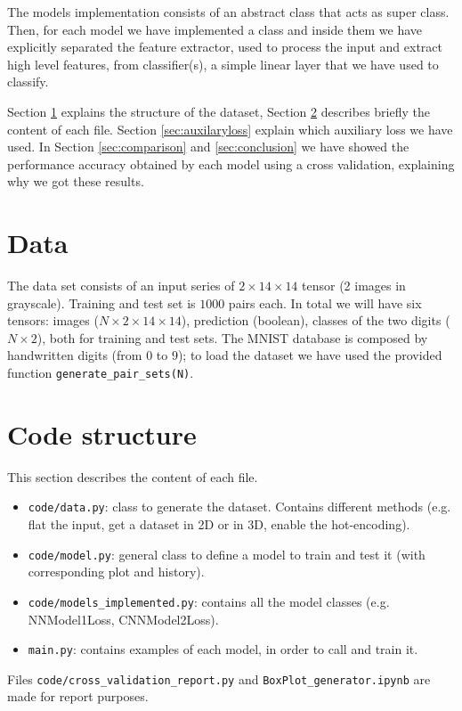 \documentclass[journal, a4paper]{IEEEtran}
\begin{document}
The models implementation consists of an abstract class that acts as super class. Then, for each model we have implemented a class and inside them we have explicitly separated the feature extractor, used to process the input and extract high level features, from classifier(s), a simple linear layer that we have used to classify.

Section \ref{sec:data} explains the structure of the dataset, Section \ref{sec:codestruc} describes briefly the content of each file. Section \ref{sec:auxilaryloss} explain which auxiliary loss we have used. In Section \ref{sec:comparison} and \ref{sec:conclusion} we have showed the performance accuracy obtained by each model using a cross validation, explaining why we got these results.


\section{Data}
\label{sec:data}
The data set consists of an input series of $2\times14\times14$ tensor (2 images in grayscale). Training and test set is $1000$ pairs each. In total we will have six tensors: images ($N\times2\times14\times14$), prediction (boolean), classes of the two digits ($N\times2$), both for training and test sets. The MNIST database is composed by handwritten digits (from $0$ to $9$); to load the dataset we have used the provided function \texttt{generate\_pair\_sets(N)}.

\section{Code structure}
\label{sec:codestruc}
This section describes the content of each file.
\begin{itemize}
    \item \texttt{code/data.py}: class to generate the dataset. Contains different methods (e.g. flat the input, get a dataset in 2D or in 3D, enable the hot-encoding).
    \item \texttt{code/model.py}: general class to define a model to train and test it (with corresponding plot and history).
    \item \texttt{code/models\_implemented.py}: contains all the model classes (e.g. NNModel1Loss, CNNModel2Loss).
    \item \texttt{main.py}: contains examples of each model, in order to call and train it.
\end{itemize}
Files \texttt{code/cross\_validation\_report.py} and \texttt{BoxPlot\_generator.ipynb} are made for report purposes.
\end{document}

